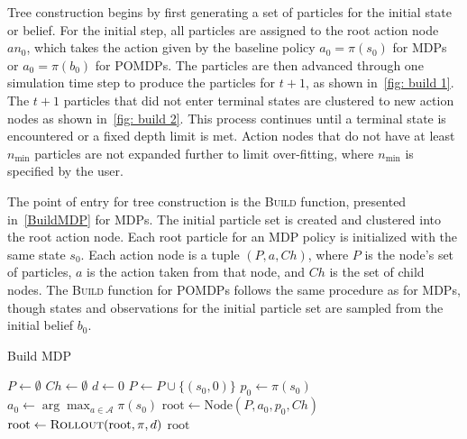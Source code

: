 \documentclass[letterpaper]{article} %
\begin{document}
Tree construction begins by first generating a set of particles for the initial state or belief.
For the initial step, all particles are assigned to the root action node $an_0$, which takes the action given by the baseline policy $a_0 = \pi(s_0)$ for MDPs or $a_0 = \pi(b_0)$ for POMDPs.
The particles are then advanced through one simulation time step to produce the particles for $t+1$, as shown in~\cref{fig: build 1}.
The $t+1$ particles that did not enter terminal states are clustered to new action nodes as shown in~\cref{fig: build 2}.
This process continues until a terminal state is encountered or a fixed depth limit is met.
Action nodes that do not have at least $n_{\min}$ particles are not expanded further to limit over-fitting, where $n_{\min}$ is specified by the user.

The point of entry for tree construction is the \textsc{Build} function, presented in~\cref{BuildMDP} for MDPs.
The initial particle set is created and clustered into the root action node.
Each root particle for an MDP policy is initialized with the same state $s_0$.
Each action node is a tuple $(P, a, Ch)$, where $P$ is the node's set of particles, $a$ is the action taken from that node, and $Ch$ is the set of child nodes.
The \textsc{Build} function for POMDPs follows the same procedure as for MDPs, though states and observations for the initial particle set are sampled from the initial belief $b_0$.
\begin{algorithm}[htb]
\caption{Build MDP}\label{BuildMDP}
\begin{algorithmic}[1]
        \State $P \gets \emptyset$
        \State $Ch \gets \emptyset$
        \State $d \gets 0$
            \State $P \gets P \cup \{ (s_0, 0) \}$
        \EndFor
        \State $p_0 \gets \pi(s_0)$
        \State $a_0 \gets \arg\max_{a \in \mathcal{A}} \pi(s_0)$
        \State $\text{root} \gets \text{Node}(P, a_0, p_0, Ch)$
        \State $\text{root} \gets \textsc{Rollout}(\text{root}, \pi, d)$
        \State \Return $\text{root}$
    \EndProcedure
\end{algorithmic}
\end{algorithm}
\end{document}

